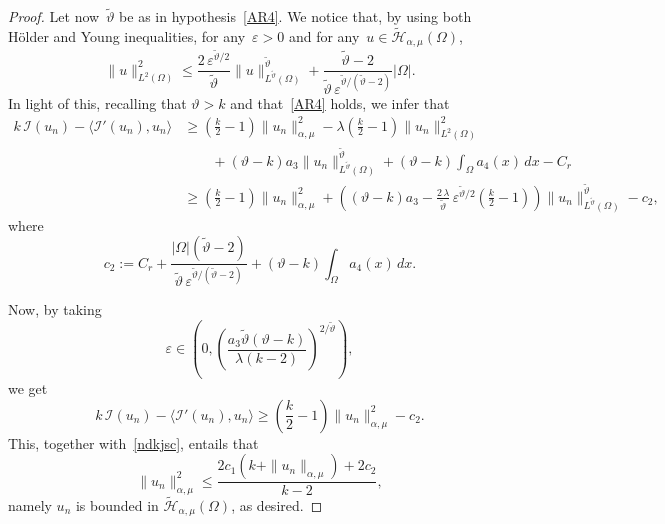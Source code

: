 \documentclass[10pt,a4paper]{amsart}
\renewcommand{\ge}{\geqslant}
\renewcommand{\le}{\leqslant}
\begin{document}
\begin{proof}
Let now~$\widetilde\vartheta$ be as in hypothesis~\eqref{AR4}. We notice that, by using both H\"older and Young inequalities,
for any~$\varepsilon>0$ and for any~$u\in \widetilde{\mathcal{H}}_{\alpha, \mu}(\Omega)$,
\[
\|u\|^2_{L^2(\Omega)}\le \frac{2\,\varepsilon^{\widetilde\vartheta/2}}{\widetilde\vartheta} \|u\|^{\widetilde\vartheta}_{L^{\widetilde\vartheta}(\Omega)} +\frac{\widetilde\vartheta -2}{\widetilde\vartheta\,\varepsilon^{\widetilde\vartheta/{(\widetilde\vartheta -2)}}} |\Omega|.
\]
In light of this, recalling that $\vartheta>k$ and that~\eqref{AR4} holds, we infer that
\[
\begin{split}
k\, \mathcal I(u_n) -\langle \mathcal I'(u_n), u_n\rangle&\ge\left(\frac{k}{2}-1\right)\|u_n\|^2_{\alpha, \mu}-\lambda\left(\frac{k}{2}-1\right)\|u_n\|^2_{L^2(\Omega)}\\
&\qquad +(\vartheta -k) a_3 \|u_n\|^{\widetilde\vartheta}_{L^{\widetilde\vartheta}(\Omega)} +(\vartheta - k)\int_\Omega a_4(x) \,dx -C_r\\
&\ge\left(\frac{k}{2}-1\right)\|u_n\|^2_{\alpha, \mu} + \left((\vartheta-k)a_3-\frac{2\,\lambda}{\widetilde\vartheta}\,\varepsilon^{\widetilde\vartheta/2}\left(\frac{k}{2}-1 \right)\right)\|u_n\|^{\widetilde\vartheta}_{L^{\widetilde\vartheta}(\Omega)} -c_2,
\end{split}
\]
where
\[
c_2:= C_r +\frac{|\Omega|(\widetilde\vartheta-2)}{\widetilde\vartheta\,\varepsilon^{\widetilde\vartheta/(\widetilde\vartheta-2)}} +(\vartheta - k)\int_\Omega a_4(x) \,dx. 
\]

Now, by taking
\[
\varepsilon\in\left(0, \left(\frac{a_3\widetilde\vartheta (\vartheta-k)}{\lambda(k-2)}\right)^{2/\widetilde\vartheta}\right),
\]
we get
\[
k\, \mathcal I(u_n) -\langle \mathcal I'(u_n), u_n\rangle\ge \left(\frac{k}{2}-1\right)\|u_n\|^2_{\alpha, \mu} -c_2.
\]
This, together with~\eqref{ndkjsc}, entails that 
\[
\|u_n\|^2_{\alpha, \mu}\le \frac{2c_1 (k +\|u_n\|_{\alpha, \mu}) +2c_2}{k-2},
\]
namely $u_n$ is bounded in $\widetilde{\mathcal{H}}_{\alpha, \mu}(\Omega)$, as desired.
\end{proof}
\end{document}
